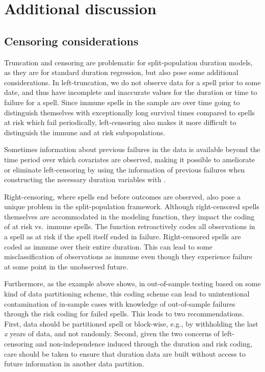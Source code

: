 \section{Additional discussion}

\subsection{Censoring considerations}

Truncation and censoring are problematic for split-population duration
models, as they are for standard duration regression, but also pose some
additional considerations. In left-truncation, we do not observe data
for a spell prior to some date, and thus have incomplete and inaccurate
values for the duration or time to failure for a spell. Since immune
spells in the sample are over time going to distinguish themselves with
exceptionally long survival times compared to spells at risk which fail
periodically, left-censoring also makes it more difficult to distinguish
the immune and at risk subpopulations.

Sometimes information about previous failures in the data is available
beyond the time period over which covariates are observed, making it
possible to ameliorate or eliminate left-censoring by using the
information of previous failures when constructing the necessary
duration variables with .

Right-censoring, where spells end before outcomes are observed, also
pose a unique problem in the split-population framework. Although
right-censored spells themselves are accommodated in the modeling
function, they impact the coding of at risk vs.~immune spells. The
 function retroactively codes all observations in
a spell as at risk if the spell itself ended in failure. Right-censored
spells are coded as immune over their entire duration. This can lead to
some misclassification of observations as immune even though they
experience failure at some point in the unobserved future.

Furthermore, as the example above shows, in out-of-sample testing based
on some kind of data partitioning scheme, this coding scheme can lead to
unintentional contamination of in-sample cases with knowledge of
out-of-sample failures through the risk coding for failed spells. This
leads to two recommendations. First, data should be partitioned spell or
block-wise, e.g., by withholding the last \emph{x} years of data, and
not randomly. Second, given the two concerns of left-censoring and
non-independence induced through the duration and risk coding, care
should be taken to ensure that duration data are built without access to
future information in another data partition.

